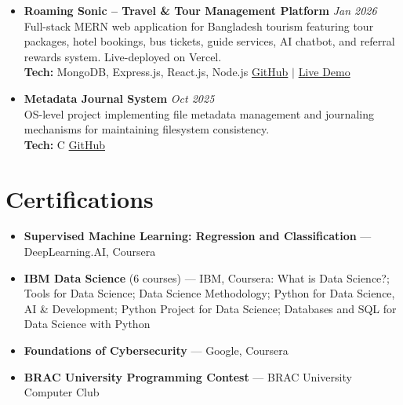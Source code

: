 \documentclass[a4paper,11pt]{article}
\newcommand{\cvmeta}[1]{\textcolor{cvmuted}{\textit{#1}}}
\begin{document}
\begin{itemize}[leftmargin=*, itemsep=7pt, parsep=0pt, topsep=3pt]
    \item \textbf{Roaming Sonic -- Travel \& Tour Management Platform} \hfill \cvmeta{Jan 2026}\\
    Full-stack MERN web application for Bangladesh tourism featuring tour packages, hotel bookings, bus tickets, guide services, AI chatbot, and referral rewards system. Live-deployed on Vercel.\\
    \textbf{Tech:} MongoDB, Express.js, React.js, Node.js \quad \href{https://github.com/Shiva-Prasad-Sarkar/Roaming-Sonic}{GitHub} $|$ \href{https://roaming-sonic.vercel.app/}{Live Demo}

    \item \textbf{Metadata Journal System} \hfill \cvmeta{Oct 2025}\\
    OS-level project implementing file metadata management and journaling mechanisms for maintaining filesystem consistency.\\
    \textbf{Tech:} C \quad \href{https://github.com/Aditi-Adri/CSE321-metadata-journal}{GitHub}

\end{itemize}

\section*{Certifications}
\begin{itemize}[leftmargin=1.2em, labelsep=0.4em, itemsep=2pt, parsep=0pt, topsep=3pt]
    \item \textbf{Supervised Machine Learning: Regression and Classification} --- DeepLearning.AI, Coursera
    \item \textbf{IBM Data Science} (6 courses) --- IBM, Coursera: What is Data Science?; Tools for Data Science; Data Science Methodology; Python for Data Science, AI \& Development; Python Project for Data Science; Databases and SQL for Data Science with Python
    \item \textbf{Foundations of Cybersecurity} --- Google, Coursera
    \item \textbf{BRAC University Programming Contest} --- BRAC University Computer Club
\end{itemize}
\end{document}
